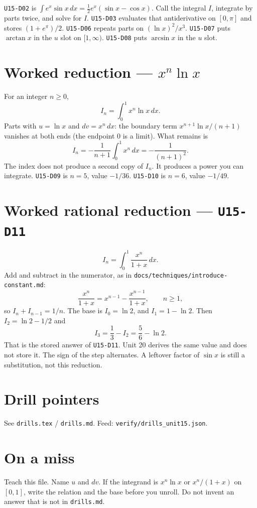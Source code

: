 \texttt{U15-D02} is $\int e^x\sin x\,dx=\frac12 e^x(\sin x-\cos x)$. Call the integral $I$, integrate by parts twice, and solve for $I$. \texttt{U15-D03} evaluates that antiderivative on $[0,\pi]$ and stores $(1+e^{\pi})/2$. \texttt{U15-D06} repeats parts on $(\ln x)^2/x^3$. \texttt{U15-D07} puts $\arctan x$ in the $u$ slot on $[1,\infty)$. \texttt{U15-D08} puts $\arcsin x$ in the $u$ slot.

\section{Worked reduction --- $x^n\ln x$}
For an integer $n\ge 0$,
\[
I_n=\int_0^1 x^n\ln x\,dx.
\]
Parts with $u=\ln x$ and $dv=x^n\,dx$: the boundary term $x^{n+1}\ln x/(n+1)$ vanishes at both ends (the endpoint $0$ is a limit). What remains is
\[
I_n=-\frac{1}{n+1}\int_0^1 x^n\,dx=-\frac{1}{(n+1)^2}.
\]
The index does not produce a second copy of $I_n$. It produces a power you can integrate. \texttt{U15-D09} is $n=5$, value $-1/36$. \texttt{U15-D10} is $n=6$, value $-1/49$.

\section{Worked rational reduction --- \texttt{U15-D11}}
\[
I_n=\int_0^1\frac{x^n}{1+x}\,dx.
\]
Add and subtract in the numerator, as in \texttt{docs/techniques/introduce-constant.md}:
\[
\frac{x^n}{1+x}=x^{n-1}-\frac{x^{n-1}}{1+x},\qquad n\ge 1,
\]
so $I_n+I_{n-1}=1/n$. The base is $I_0=\ln 2$, and $I_1=1-\ln 2$. Then $I_2=\ln 2-1/2$ and
\[
I_3=\frac13-I_2=\frac56-\ln 2.
\]
That is the stored answer of \texttt{U15-D11}. Unit 20 derives the same value and does not store it. The sign of the step alternates. A leftover factor of $\sin x$ is still a substitution, not this reduction.

\section{Drill pointers}
See \texttt{drills.tex} / \texttt{drills.md}. Feed: \texttt{verify/drills\_unit15.json}.

\section*{On a miss}
Teach this file. Name $u$ and $dv$. If the integrand is $x^n\ln x$ or $x^n/(1+x)$ on $[0,1]$, write the relation and the base before you unroll. Do not invent an answer that is not in \texttt{drills.md}.

